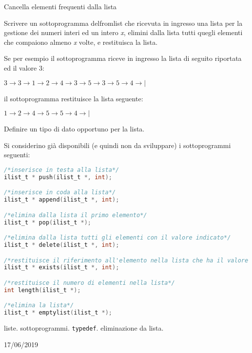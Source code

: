 
\begin{exrev}{Cancella elementi frequenti dalla lista}

Scrivere un sottoprogramma delfromlist che ricevuta in ingresso una lista per la gestione dei numeri interi ed un intero \textit{x}, elimini dalla lista tutti quegli elementi che compaiono almeno \textit{x} volte, e restituisca la lista. 

Se per esempio il sottoprogramma riceve in ingresso la lista di seguito riportata ed il valore 3:

$3 \rightarrow 3 \rightarrow 1 \rightarrow 2 \rightarrow 4 \rightarrow 3 \rightarrow 5 \rightarrow 3 \rightarrow 5 \rightarrow 4 \rightarrow |$

il sottoprogramma restituisce la lista seguente:

$1 \rightarrow 2 \rightarrow 4 \rightarrow 5 \rightarrow 5 \rightarrow 4 \rightarrow |$

Definire un tipo di dato opportuno per la lista.

Si considerino gi\`a disponibili (e quindi non da sviluppare) i sottoprogrammi seguenti:

\begin{lstlisting}[language=c]
/*inserisce in testa alla lista*/
ilist_t * push(ilist_t *, int);

/*inserisce in coda alla lista*/
ilist_t * append(ilist_t *, int);

/*elimina dalla lista il primo elemento*/
ilist_t * pop(ilist_t *);

/*elimina dalla lista tutti gli elementi con il valore indicato*/
ilist_t * delete(ilist_t *, int);

/*restituisce il riferimento all'elemento nella lista che ha il valore indicato, se esiste*/
ilist_t * exists(ilist_t *, int);

/*restituisce il numero di elementi nella lista*/
int length(ilist_t *);

/*elimina la lista*/
ilist_t * emptylist(ilist_t *);
\end{lstlisting}

\begin{tags}
liste. sottoprogrammi. \texttt{typedef}. eliminazione da lista.
\end{tags}

\begin{esame}
17/06/2019
\end{esame}


\end{exrev}

